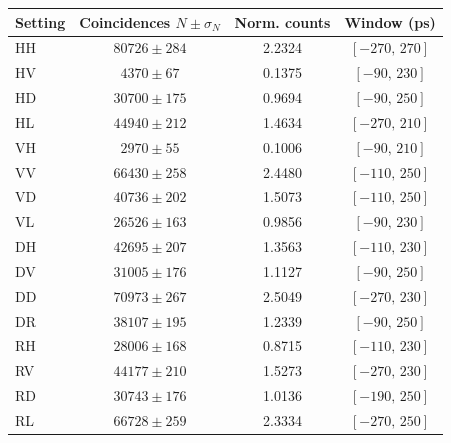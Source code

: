 \begin{tabular}{lccc}
\hline
Setting & Coincidences $N\pm\sigma_N$ & Norm. counts & Window (ps) \\
\hline
HH & $80726\pm284$ & 2.2324 & $[-270,\,270]$ \\
HV & $4370\pm67$ & 0.1375 & $[-90,\,230]$ \\
HD & $30700\pm175$ & 0.9694 & $[-90,\,250]$ \\
HL & $44940\pm212$ & 1.4634 & $[-270,\,210]$ \\
VH & $2970\pm55$ & 0.1006 & $[-90,\,210]$ \\
VV & $66430\pm258$ & 2.4480 & $[-110,\,250]$ \\
VD & $40736\pm202$ & 1.5073 & $[-110,\,250]$ \\
VL & $26526\pm163$ & 0.9856 & $[-90,\,230]$ \\
DH & $42695\pm207$ & 1.3563 & $[-110,\,230]$ \\
DV & $31005\pm176$ & 1.1127 & $[-90,\,250]$ \\
DD & $70973\pm267$ & 2.5049 & $[-270,\,230]$ \\
DR & $38107\pm195$ & 1.2339 & $[-90,\,250]$ \\
RH & $28006\pm168$ & 0.8715 & $[-110,\,230]$ \\
RV & $44177\pm210$ & 1.5273 & $[-270,\,230]$ \\
RD & $30743\pm176$ & 1.0136 & $[-190,\,250]$ \\
RL & $66728\pm259$ & 2.3334 & $[-270,\,250]$ \\
\hline
\end{tabular}